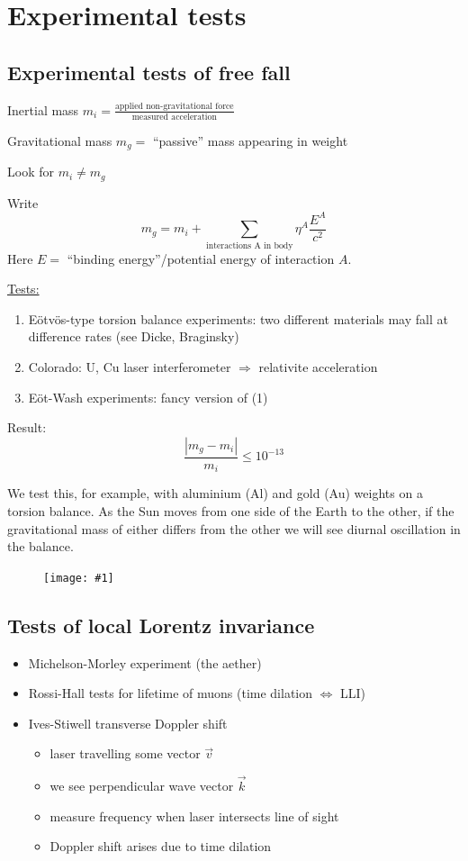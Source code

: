 \documentclass[a4paper]{article} %
\renewcommand{\picture}[1]
{
\begin{figure}[h]
\centering
\texttt{[image: \#1]}
\end{figure}
}
\begin{document}
\section{Experimental tests}
\subsection{Experimental tests of free fall}
Inertial mass $m_i=\frac{\text{applied non-gravitational force}}{\text{measured acceleration}}$

Gravitational mass $m_g=$ ``passive'' mass appearing in weight

Look for $m_i \neq m_g$

Write 
\begin{equation}
m_g=m_i + \sum_{\text{interactions A in body}}\eta^A \frac{E^A}{c^2}
\end{equation} 
Here $E=$ ``binding energy''/potential energy of interaction $A$.

\underline{Tests:}
\begin{enumerate}
\item E{\"o}tv{\"o}s-type torsion balance experiments: two different materials may fall at difference rates (see Dicke, Braginsky)
\item Colorado: U, Cu laser interferometer $\Rightarrow$ relativite acceleration
\item E{\"o}t-Wash experiments: fancy version of (1)
\end{enumerate}

Result:
\begin{equation}
\frac{|m_g-m_i|}{m_i}\leq 10^{-13}
\end{equation}

We test this, for example, with aluminium (Al) and gold (Au) weights on a torsion balance. As the Sun moves from one side of the Earth to the other, if the gravitational mass of either differs from the other we will see diurnal oscillation in the balance.

\picture{images/eotvos.png}

\subsection{Tests of local Lorentz invariance}
\begin{itemize}
\item Michelson-Morley experiment (the aether)
\item Rossi-Hall tests for lifetime of muons (time dilation $\Leftrightarrow$ LLI)
\item Ives-Stiwell transverse Doppler shift
\begin{itemize}
\item laser travelling some vector $\vec{v}$
\item we see perpendicular wave vector $\vec{k}$
\item measure frequency when laser intersects line of sight
\item Doppler shift arises due to time dilation
\end{itemize}
\end{itemize}
\end{document}
